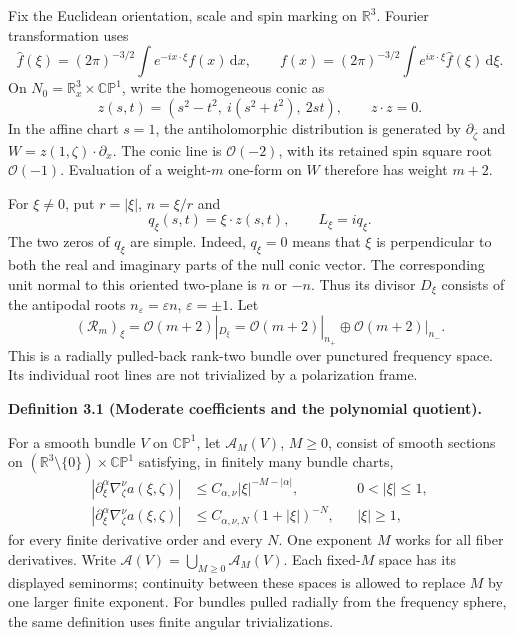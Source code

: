 \documentclass[
  english,
  11pt,
  reqno]{amsart}
\makeatletter
\newcommand{\pandocstatementheading}[1]{%
  \par\if@nobreak\else
    \addpenalty{\@beginparpenalty}%
    \addvspace{.5\baselineskip plus .2\baselineskip minus .2\baselineskip}%
  \fi
  {\normalfont\bfseries #1\par}%
  \nobreak\@afterindenttrue\@afterheading
}
\makeatother
\begin{document}
Fix the Euclidean orientation, scale and spin marking on
\(\mathbb R^3\). Fourier transformation uses%
 \[
\widehat f(\xi)=(2\pi)^{-3/2}\int e^{-ix\cdot\xi}f(x)\,\mathrm dx,
\qquad
f(x)=(2\pi)^{-3/2}\int e^{ix\cdot\xi}\widehat f(\xi)\,\mathrm d\xi.
\] On \(N_0=\mathbb R^3_x\times\mathbb{CP}^1\), write the homogeneous
conic as%
 \[
z(s,t)=(s^2-t^2,\ i(s^2+t^2),\ 2st),
\qquad z\cdot z=0.
\] In the affine chart \(s=1\), the antiholomorphic distribution is
generated by \(\partial_{\bar\zeta}\) and
\(W=z(1,\zeta)\cdot\partial_x\). The conic line is \(\mathcal O(-2)\),
with its retained spin square root \(\mathcal O(-1)\). Evaluation of a
weight-\(m\) one-form on \(W\) therefore has weight \(m+2\).

For \(\xi\ne0\), put \(r=|\xi|\), \(n=\xi/r\) and%
 \[
q_\xi(s,t)=\xi\cdot z(s,t),
\qquad L_\xi=iq_\xi.
\] The two zeros of \(q_\xi\) are simple. Indeed, \(q_\xi=0\) means that
\(\xi\) is perpendicular to both the real and imaginary parts of the
null conic vector. The corresponding unit normal to this oriented
two-plane is \(n\) or \(-n\). Thus its divisor \(D_\xi\) consists of the
antipodal roots \(n_\varepsilon=\varepsilon n\), \(\varepsilon=\pm1\).
Let%
 \[
(\mathcal R_m)_\xi=\mathcal O(m+2)|_{D_\xi}
=\mathcal O(m+2)|_{n_+}\oplus\mathcal O(m+2)|_{n_-}.
\] This is a radially pulled-back rank-two bundle over punctured
frequency space. Its individual root lines are not trivialized by a
polarization frame.

\pandocstatementheading{\leavevmode{}\label{def:online-moderate-root-coefficients}Definition 3.1 (Moderate coefficients and the polynomial quotient).}

For a smooth bundle \(V\) on \(\mathbb{CP}^1\), let \(\mathscr A_M(V)\),
\(M\ge0\), consist of smooth sections on
\((\mathbb R^3\setminus\{0\})\times\mathbb{CP}^1\) satisfying, in
finitely many bundle charts,%
 \[
\begin{aligned}
|\partial_\xi^\alpha\nabla_\zeta^\nu a(\xi,\zeta)|
&\le C_{\alpha,\nu}|\xi|^{-M-|\alpha|},
&&0<|\xi|\le1,\\
|\partial_\xi^\alpha\nabla_\zeta^\nu a(\xi,\zeta)|
&\le C_{\alpha,\nu,N}(1+|\xi|)^{-N},
&&|\xi|\ge1,
\end{aligned}
\] for every finite derivative order and every \(N\). One exponent \(M\)
works for all fiber derivatives. Write
\(\mathscr A(V)=\bigcup_{M\ge0}\mathscr A_M(V)\). Each fixed-\(M\) space
has its displayed seminorms; continuity between these spaces is allowed
to replace \(M\) by one larger finite exponent. For bundles pulled
radially from the frequency sphere, the same definition uses finite
angular trivializations.
\end{document}
